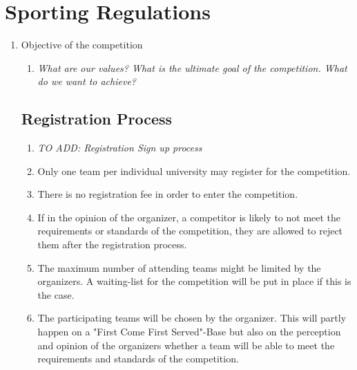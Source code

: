 
\chapter{Sporting Regulations}\label{chapter:Sporting Regulations}

\begin{enumerate}
  \section{General}
  \item{Objective of the competition}
    \begin{enumerate}
      \item \emph{What are our values? What is the ultimate goal of the competition. What do we want to achieve?}
    \end{enumerate}

  \section{Registration Process}
    \begin{enumerate}
      \item \emph{TO ADD: Registration Sign up process}
      \item Only one team per individual university may register for the competition.  
      \item There is no registration fee in order to enter the competition. 
      \item If in the opinion of the organizer, a competitor is likely to not meet the requirements or standards
      of the competition, they are allowed to reject them after the registration process. 
      \item The maximum number of attending teams might be limited by the organizers. A waiting-list for the competition
      will be put in place if this is the case. 
      \item The participating teams will be chosen by the organizer. This will partly happen on a "First Come First Served"-Base but also
      on the perception and opinion of the organizers whether a team will be able to meet the requirements and standards of the competition. 
    \end{enumerate}


\end{enumerate}
